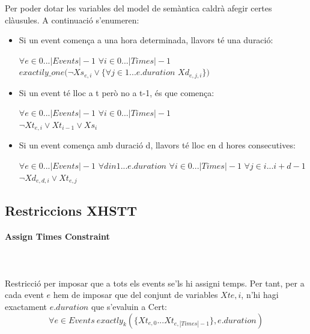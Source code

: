 \documentclass[11pt,a4paper,twoside]{report}
\begin{document}
  Per poder dotar les variables del model de semàntica caldrà afegir certes clàusules. A continuació s'enumeren:
  \begin{itemize}
    \item Si un event comença a una hora determinada, llavors té una duració: \begin{center} $\forall e \in 0 ... |Events|-1$ $\forall i \in 0 ... |Times|-1$ \\$exactily\_one(\neg Xs_{e,i} \vee \{ \forall j \in 1 ... e.duration$ $Xd_{e,j,i}\})$\end{center}
    \item Si un event té lloc a t però no a t-1, és que comença: \begin{center} $\forall e \in 0 ... |Events|-1$ $\forall i \in 0 ... |Times|-1$ \\$\neg Xt_{e,i} \vee Xt_{i-1} \vee Xs_i$ \end{center}
    \item Si un event comença amb duració d, llavors té lloc en d hores consecutives: \begin{center} 
      $\forall e \in 0 ... |Events|-1$ $\forall d in 1 ... e.duration$ $\forall i \in 0 ... |Times|-1$ $\forall j \in i ... i+d-1$ \\
      $\neg Xd_{e,d,i} \vee Xt_{e,j}$
    
    \end{center}
  \end{itemize}

  \subsection{Restriccions XHSTT}
  \paragraph*{Assign Times Constraint} ~\\~\\
  
  Restricció per imposar que a tots els events se'ls hi assigni temps. Per tant, per a cada event $e$ hem de imposar que del conjunt de variables $Xt{e,i}$, n'hi hagi exactament $e.duration$ que s'evaluin a Cert:
  \[
    \forall e \in Events \ exactly_k(\{Xt_{e,0} ... Xt_{e,|Times|-1}\}, e.duration)
  \]
\end{document}
